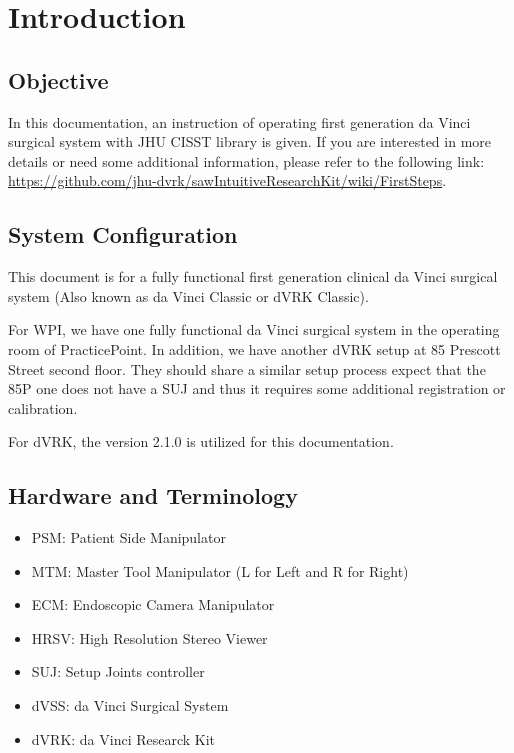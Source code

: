 \chapter{Introduction}
\label{ch:intro}

\section{Objective}

In this documentation, an instruction of operating first generation da Vinci surgical system with JHU CISST library is given. If you are interested in more details or need some additional information, please refer to the following link: \url{https://github.com/jhu-dvrk/sawIntuitiveResearchKit/wiki/FirstSteps}.

\section{System Configuration}

This document is for a fully functional first generation clinical da Vinci surgical system (Also known as da Vinci Classic or dVRK Classic). 

For WPI, we have one fully functional da Vinci surgical system in the operating room of PracticePoint. In addition, we have another dVRK setup at 85 Prescott Street second floor. They should share a similar setup process expect that the 85P one does not have a SUJ and thus it requires some additional registration or calibration. 

For dVRK, the version 2.1.0 is utilized for this documentation.

\section{Hardware and Terminology}

\begin{itemize}
    \item PSM: Patient Side Manipulator
    \item MTM: Master Tool Manipulator (L for Left and R for Right)
    \item ECM: Endoscopic Camera Manipulator
    \item HRSV: High Resolution Stereo Viewer
    \item SUJ: Setup Joints controller
    \item dVSS: da Vinci Surgical System
    \item dVRK: da Vinci Researck Kit
\end{itemize}

